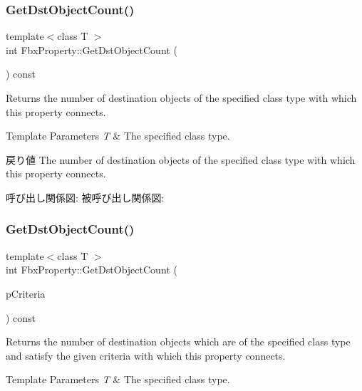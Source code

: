 \subsubsection{\texorpdfstring{Get\+Dst\+Object\+Count()}{GetDstObjectCount()}\hspace{0.1cm}{\footnotesize\ttfamily [3/4]}}
{\footnotesize\ttfamily template$<$class T $>$ \\
int Fbx\+Property\+::\+Get\+Dst\+Object\+Count (\begin{DoxyParamCaption}{ }\end{DoxyParamCaption}) const}

Returns the number of destination objects of the specified class type with which this property connects. 
\begin{DoxyTemplParams}{Template Parameters}
{\em T} & The specified class type. \\
\hline
\end{DoxyTemplParams}
\begin{DoxyReturn}{戻り値}
The number of destination objects of the specified class type with which this property connects. 
\end{DoxyReturn}
呼び出し関係図\+:
被呼び出し関係図\+:
\mbox{\label{class_fbx_property_a5ba90af060ad449844816a3234ad0750}} 
\subsubsection{\texorpdfstring{Get\+Dst\+Object\+Count()}{GetDstObjectCount()}\hspace{0.1cm}{\footnotesize\ttfamily [4/4]}}
{\footnotesize\ttfamily template$<$class T $>$ \\
int Fbx\+Property\+::\+Get\+Dst\+Object\+Count (\begin{DoxyParamCaption}\item[{const \hyperlink{class_fbx_criteria}{Fbx\+Criteria} \&}]{p\+Criteria }\end{DoxyParamCaption}) const}

Returns the number of destination objects which are of the specified class type and satisfy the given criteria with which this property connects. 
\begin{DoxyTemplParams}{Template Parameters}
{\em T} & The specified class type. \\
\hline
\end{DoxyTemplParams}

